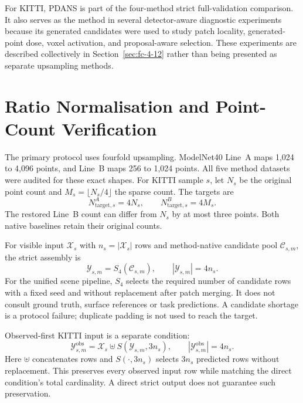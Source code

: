 For KITTI, PDANS is part of the four-method strict full-validation comparison. It also serves as the method in several detector-aware diagnostic experiments because its generated candidates were used to study patch locality, generated-point dose, voxel activation, and proposal-aware selection. These experiments are described collectively in Section~\ref{sec:fc-4-12} rather than being presented as separate upsampling methods.

\section{Ratio Normalisation and Point-Count Verification}
\label{sec:fc-4-6}

The primary protocol uses fourfold upsampling. ModelNet40 Line~A
maps 1,024 to 4,096 points, and Line~B maps 256 to 1,024 points.
All five method datasets were audited for these exact shapes.
For KITTI sample $s$, let $N_s$ be the original point count and
$M_s=\lfloor N_s/4\rfloor$ the sparse count. The targets are
\begin{equation}
N^A_{\mathrm{target},s}=4N_s,\qquad
N^B_{\mathrm{target},s}=4M_s.
\label{eq:fc-3-3}
\end{equation}
The restored Line~B count can differ from $N_s$ by at most three points.
Both native baselines retain their original counts.

For visible input $\mathcal X_s$ with $n_s=|\mathcal X_s|$ rows and
method-native candidate pool $\mathcal C_{s,m}$, the strict assembly is
\begin{equation}
\mathcal Y_{s,m}=S_4(\mathcal C_{s,m}),\qquad
|\mathcal Y_{s,m}|=4n_s.
\label{eq:fc-3-6}
\end{equation}
For the unified scene pipeline, $S_4$ selects the required number of
candidate rows with a fixed seed and without replacement after patch
merging. It does not consult ground truth, surface references or task
predictions. A candidate shortage is a protocol failure; duplicate
padding is not used to reach the target.

Observed-first KITTI input is a separate condition:
\begin{equation}
\mathcal Y^{\mathrm{obs}}_{s,m}
 =\mathcal X_s\uplus S(\mathcal Y_{s,m},3n_s),\qquad
|\mathcal Y^{\mathrm{obs}}_{s,m}|=4n_s.
\label{eq:fc-3-7}
\end{equation}
Here $\uplus$ concatenates rows and $S(\cdot,3n_s)$ selects $3n_s$
predicted rows without replacement. This preserves every observed
input row while matching the direct condition's total cardinality.
A direct strict output does not guarantee such preservation.

